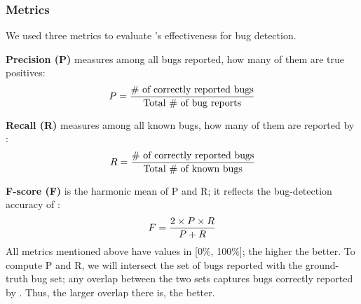    \vspace{-.5em}
\subsubsection{Metrics} \label{sss:metrics}
	We used three metrics to evaluate \tool's effectiveness for bug detection.

\textbf{Precision (P)} measures among all bugs \tool reported, how many of them are true positives:
\begin{equation*}\label{eq:precision}
 \vspace{-.5em}	
	    P = \frac{\mbox{\# of correctly reported bugs}}{\mbox{Total \# of bug reports}} 
	\end{equation*}
	
\textbf{Recall (R)} measures among all known bugs, how many of them are reported by \tool:
	\begin{equation*}
	\label{eq:recall}
 \vspace{-.5em} 
	    R = \frac{\mbox{\# of correctly reported bugs}}{\mbox{Total \# of known bugs}}
	\end{equation*}

\textbf{F-score (F)} is the harmonic mean of P and R; it reflects the bug-detection accuracy of \tool: 
	\begin{equation*}
	\label{eq:fscore}
 \vspace{-.5em} 
	    F = \frac{2 \times P \times R}{P + R} 
	\end{equation*}
All metrics mentioned above have values in [0\%, 100\%]; the higher the better. To compute P and R, we will intersect the set of bugs reported with the ground-truth bug set; any overlap between the two sets captures bugs correctly reported by \tool. Thus, the larger overlap there is, the better.



